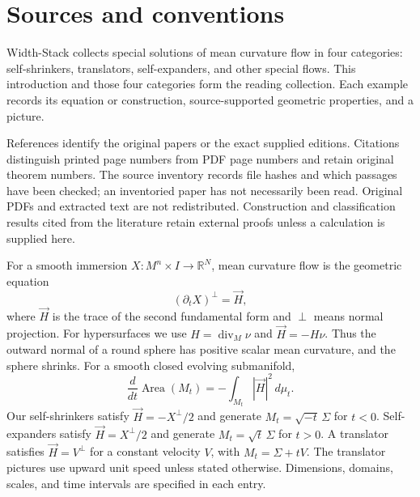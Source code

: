 \chapter{Sources and conventions}\label{sec:sources-conventions}
Width-Stack collects special solutions of mean curvature flow in four categories: self-shrinkers, translators, self-expanders, and other special flows. This introduction and those four categories form the reading collection. Each example records its equation or construction, source-supported geometric properties, and a picture.

\begin{remark}\label{rem:source-editions}
References identify the original papers or the exact supplied editions. Citations distinguish printed page numbers from PDF page numbers and retain original theorem numbers. The source inventory records file hashes and which passages have been checked; an inventoried paper has not necessarily been read. Original PDFs and extracted text are not redistributed. Construction and classification results cited from the literature retain external proofs unless a calculation is supplied here.
\end{remark}

\begin{remark}\label{rem:notation}
For a smooth immersion $X:M^n\times I\to\mathbb R^N$, mean curvature flow is the geometric equation
\[
 (\partial_tX)^\perp=\vec H,
\]
where $\vec H$ is the trace of the second fundamental form and $\perp$ means normal projection. For hypersurfaces we use $H=\operatorname{div}_M\nu$ and $\vec H=-H\nu$. Thus the outward normal of a round sphere has positive scalar mean curvature, and the sphere shrinks. For a smooth closed evolving submanifold,
\[
 \frac{d}{dt}\operatorname{Area}(M_t)=-\int_{M_t}|\vec H|^2\,d\mu_t.
\]
Our self-shrinkers satisfy $\vec H=-X^\perp/2$ and generate $M_t=\sqrt{-t}\,\Sigma$ for $t<0$. Self-expanders satisfy $\vec H=X^\perp/2$ and generate $M_t=\sqrt t\,\Sigma$ for $t>0$. A translator satisfies $\vec H=V^\perp$ for a constant velocity $V$, with $M_t=\Sigma+tV$. The translator pictures use upward unit speed unless stated otherwise. Dimensions, domains, scales, and time intervals are specified in each entry.
\end{remark}

